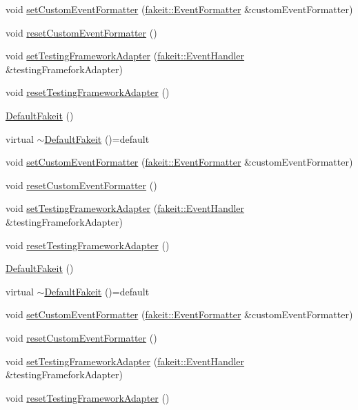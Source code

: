 \begin{DoxyCompactItemize}
void \mbox{\hyperlink{classfakeit_1_1DefaultFakeit_acd1e573c131e25862030cec8cf223035}{set\+Custom\+Event\+Formatter}} (\mbox{\hyperlink{structfakeit_1_1EventFormatter}{fakeit\+::\+Event\+Formatter}} \&custom\+Event\+Formatter)
\item 
void \mbox{\hyperlink{classfakeit_1_1DefaultFakeit_a1fe3c5a8670686b732765e6ea1e15b3b}{reset\+Custom\+Event\+Formatter}} ()
\item 
void \mbox{\hyperlink{classfakeit_1_1DefaultFakeit_a7e5375cb58acb0e27a374a32ecf37b5a}{set\+Testing\+Framework\+Adapter}} (\mbox{\hyperlink{structfakeit_1_1EventHandler}{fakeit\+::\+Event\+Handler}} \&testing\+Framefork\+Adapter)
\item 
void \mbox{\hyperlink{classfakeit_1_1DefaultFakeit_a89cf2f8dc0fbfb9e5b18d82eef8fd0c8}{reset\+Testing\+Framework\+Adapter}} ()
\item 
\mbox{\hyperlink{classfakeit_1_1DefaultFakeit_a80d5ef87779c5d3b4e9518ba39e5999f}{Default\+Fakeit}} ()
\item 
virtual \mbox{\hyperlink{classfakeit_1_1DefaultFakeit_a67a996782eb6675b0c0ee0d3b3c9728c}{$\sim$\+Default\+Fakeit}} ()=default
\item 
void \mbox{\hyperlink{classfakeit_1_1DefaultFakeit_acd1e573c131e25862030cec8cf223035}{set\+Custom\+Event\+Formatter}} (\mbox{\hyperlink{structfakeit_1_1EventFormatter}{fakeit\+::\+Event\+Formatter}} \&custom\+Event\+Formatter)
\item 
void \mbox{\hyperlink{classfakeit_1_1DefaultFakeit_a1fe3c5a8670686b732765e6ea1e15b3b}{reset\+Custom\+Event\+Formatter}} ()
\item 
void \mbox{\hyperlink{classfakeit_1_1DefaultFakeit_a7e5375cb58acb0e27a374a32ecf37b5a}{set\+Testing\+Framework\+Adapter}} (\mbox{\hyperlink{structfakeit_1_1EventHandler}{fakeit\+::\+Event\+Handler}} \&testing\+Framefork\+Adapter)
\item 
void \mbox{\hyperlink{classfakeit_1_1DefaultFakeit_a89cf2f8dc0fbfb9e5b18d82eef8fd0c8}{reset\+Testing\+Framework\+Adapter}} ()
\item 
\mbox{\hyperlink{classfakeit_1_1DefaultFakeit_a80d5ef87779c5d3b4e9518ba39e5999f}{Default\+Fakeit}} ()
\item 
virtual \mbox{\hyperlink{classfakeit_1_1DefaultFakeit_a67a996782eb6675b0c0ee0d3b3c9728c}{$\sim$\+Default\+Fakeit}} ()=default
\item 
void \mbox{\hyperlink{classfakeit_1_1DefaultFakeit_acd1e573c131e25862030cec8cf223035}{set\+Custom\+Event\+Formatter}} (\mbox{\hyperlink{structfakeit_1_1EventFormatter}{fakeit\+::\+Event\+Formatter}} \&custom\+Event\+Formatter)
\item 
void \mbox{\hyperlink{classfakeit_1_1DefaultFakeit_a1fe3c5a8670686b732765e6ea1e15b3b}{reset\+Custom\+Event\+Formatter}} ()
\item 
void \mbox{\hyperlink{classfakeit_1_1DefaultFakeit_a7e5375cb58acb0e27a374a32ecf37b5a}{set\+Testing\+Framework\+Adapter}} (\mbox{\hyperlink{structfakeit_1_1EventHandler}{fakeit\+::\+Event\+Handler}} \&testing\+Framefork\+Adapter)
\item 
void \mbox{\hyperlink{classfakeit_1_1DefaultFakeit_a89cf2f8dc0fbfb9e5b18d82eef8fd0c8}{reset\+Testing\+Framework\+Adapter}} ()
\end{DoxyCompactItemize}
